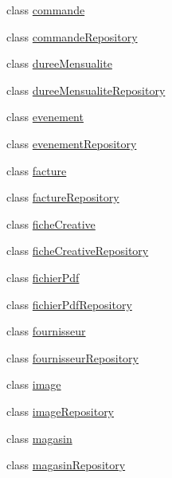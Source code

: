 \begin{DoxyCompactItemize}
\item 
class \hyperlink{class_acme_group_1_1_labo_bundle_1_1_entity_1_1commande}{commande}
\item 
class \hyperlink{class_acme_group_1_1_labo_bundle_1_1_entity_1_1commande_repository}{commande\+Repository}
\item 
class \hyperlink{class_acme_group_1_1_labo_bundle_1_1_entity_1_1duree_mensualite}{duree\+Mensualite}
\item 
class \hyperlink{class_acme_group_1_1_labo_bundle_1_1_entity_1_1duree_mensualite_repository}{duree\+Mensualite\+Repository}
\item 
class \hyperlink{class_acme_group_1_1_labo_bundle_1_1_entity_1_1evenement}{evenement}
\item 
class \hyperlink{class_acme_group_1_1_labo_bundle_1_1_entity_1_1evenement_repository}{evenement\+Repository}
\item 
class \hyperlink{class_acme_group_1_1_labo_bundle_1_1_entity_1_1facture}{facture}
\item 
class \hyperlink{class_acme_group_1_1_labo_bundle_1_1_entity_1_1facture_repository}{facture\+Repository}
\item 
class \hyperlink{class_acme_group_1_1_labo_bundle_1_1_entity_1_1fiche_creative}{fiche\+Creative}
\item 
class \hyperlink{class_acme_group_1_1_labo_bundle_1_1_entity_1_1fiche_creative_repository}{fiche\+Creative\+Repository}
\item 
class \hyperlink{class_acme_group_1_1_labo_bundle_1_1_entity_1_1fichier_pdf}{fichier\+Pdf}
\item 
class \hyperlink{class_acme_group_1_1_labo_bundle_1_1_entity_1_1fichier_pdf_repository}{fichier\+Pdf\+Repository}
\item 
class \hyperlink{class_acme_group_1_1_labo_bundle_1_1_entity_1_1fournisseur}{fournisseur}
\item 
class \hyperlink{class_acme_group_1_1_labo_bundle_1_1_entity_1_1fournisseur_repository}{fournisseur\+Repository}
\item 
class \hyperlink{class_acme_group_1_1_labo_bundle_1_1_entity_1_1image}{image}
\item 
class \hyperlink{class_acme_group_1_1_labo_bundle_1_1_entity_1_1image_repository}{image\+Repository}
\item 
class \hyperlink{class_acme_group_1_1_labo_bundle_1_1_entity_1_1magasin}{magasin}
\item 
class \hyperlink{class_acme_group_1_1_labo_bundle_1_1_entity_1_1magasin_repository}{magasin\+Repository}

\end{DoxyCompactItemize}
